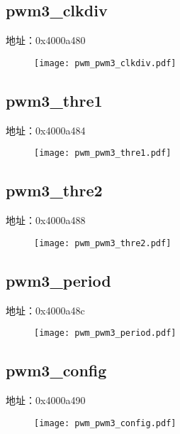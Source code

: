 \subsection{pwm3\_clkdiv}
\label{pwm-pwm3-clkdiv}
地址：0x4000a480
 \begin{figure}[H]
\texttt{[image: pwm\_pwm3\_clkdiv.pdf]}
\end{figure}

\subsection{pwm3\_thre1}
\label{pwm-pwm3-thre1}
地址：0x4000a484
 \begin{figure}[H]
\texttt{[image: pwm\_pwm3\_thre1.pdf]}
\end{figure}

\subsection{pwm3\_thre2}
\label{pwm-pwm3-thre2}
地址：0x4000a488
 \begin{figure}[H]
\texttt{[image: pwm\_pwm3\_thre2.pdf]}
\end{figure}

\subsection{pwm3\_period}
\label{pwm-pwm3-period}
地址：0x4000a48c
 \begin{figure}[H]
\texttt{[image: pwm\_pwm3\_period.pdf]}
\end{figure}

\subsection{pwm3\_config}
\label{pwm-pwm3-config}
地址：0x4000a490
 \begin{figure}[H]
\texttt{[image: pwm\_pwm3\_config.pdf]}
\end{figure}

